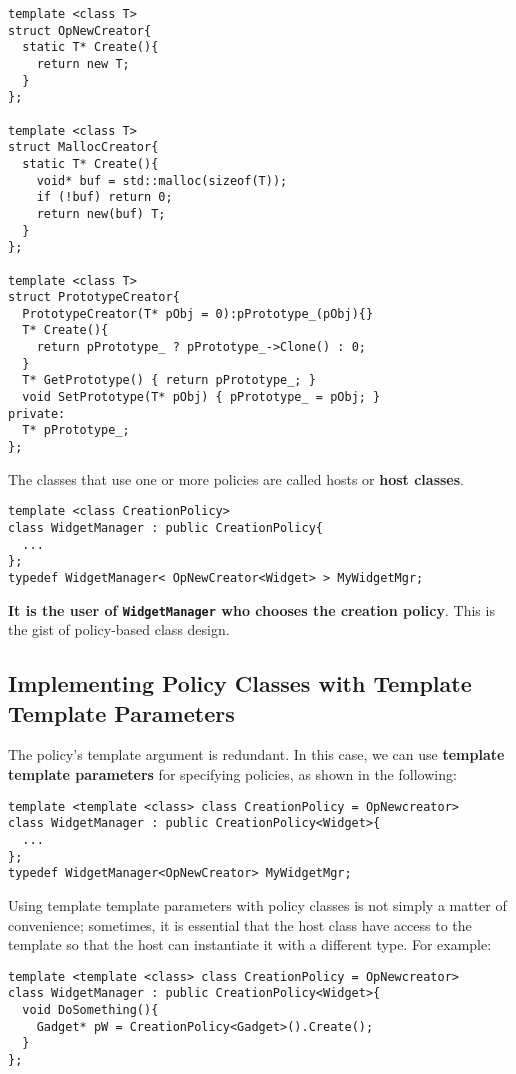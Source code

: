 \begin{verbatim}
template <class T>
struct OpNewCreator{
  static T* Create(){
    return new T;
  }
};

template <class T>
struct MallocCreator{
  static T* Create(){
    void* buf = std::malloc(sizeof(T));
    if (!buf) return 0;
    return new(buf) T;
  }
};

template <class T>
struct PrototypeCreator{
  PrototypeCreator(T* pObj = 0):pPrototype_(pObj){}
  T* Create(){
    return pPrototype_ ? pPrototype_->Clone() : 0;
  }
  T* GetPrototype() { return pPrototype_; }
  void SetPrototype(T* pObj) { pPrototype_ = pObj; }
private:
  T* pPrototype_;
};
\end{verbatim}

The classes that use one or more policies are called hosts or
\textbf{host classes}.

\begin{verbatim}
template <class CreationPolicy>
class WidgetManager : public CreationPolicy{
  ...
};
typedef WidgetManager< OpNewCreator<Widget> > MyWidgetMgr;
\end{verbatim}

\textbf{It is the user of \texttt{WidgetManager} who chooses the creation
  policy}. This is the gist of policy-based class design.

\subsection{Implementing Policy Classes with Template Template
  Parameters}

The policy's template argument is redundant. In this case, we can use
\textbf{template template parameters} for specifying policies, as shown in the
following:
\begin{verbatim}
template <template <class> class CreationPolicy = OpNewcreator>
class WidgetManager : public CreationPolicy<Widget>{
  ...
};
typedef WidgetManager<OpNewCreator> MyWidgetMgr;
\end{verbatim}

Using template template parameters with policy classes is not simply a
matter of convenience; sometimes, it is essential that the host class
have access to the template so that the host can instantiate it with a
different type. For example:

\begin{verbatim}
template <template <class> class CreationPolicy = OpNewcreator>
class WidgetManager : public CreationPolicy<Widget>{
  void DoSomething(){
    Gadget* pW = CreationPolicy<Gadget>().Create();
  }
};
\end{verbatim}

